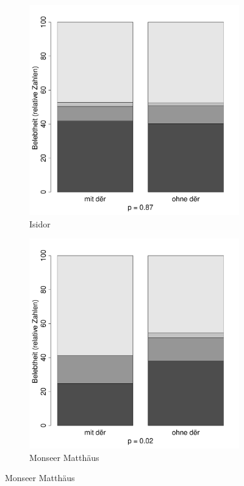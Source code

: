 \begin{figure}[p]
\begin{subfigure}[b]{.5\linewidth}
  \includegraphics[height=.25\textheight]{generated/images/belebtheit-I}
\caption {Isidor}
\end{subfigure}%
\begin{subfigure}[b]{.5\linewidth}
  \includegraphics[height=.25\textheight]{generated/images/belebtheit-M}
\caption {Monseer Matthäus}
\end{subfigure}


\end{figure}
